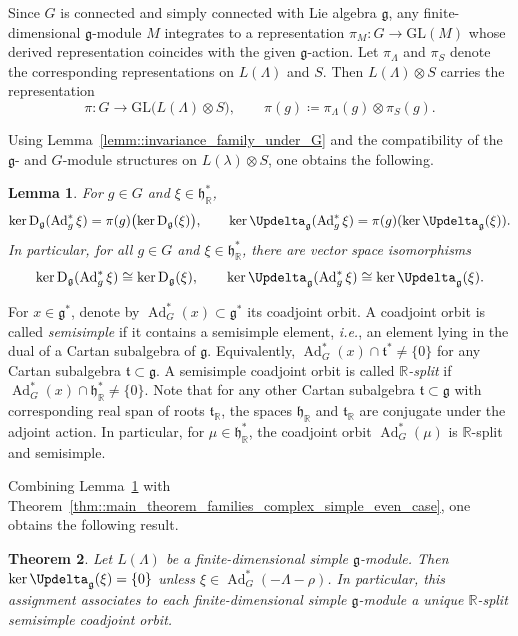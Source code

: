 \documentclass[11pt]{amsart}
\newcommand{\Dirac}{\operatorname{D}}
\def\Laplace{{\Updelta_{\gg}(\xi)}}
\def \Gl{{\mathrm{GL}}}
\def\RR{{\mathbb R}}
\def\hh{{\mathfrak h}}
\def\tt{{\mathfrak t}}
\def\gg{{\mathfrak{g}}}
\newcommand{\Ad}{\operatorname{Ad}}
\theoremstyle{plain}
\newtheorem{theorem}{Theorem}
\newtheorem{lemma}[theorem]{Lemma}
\theoremstyle{remark}
\theoremstyle{definition}
\numberwithin{equation}{section}
\theoremstyle{remark}
\begin{document}
Since $G$ is connected and simply connected with Lie algebra $\gg$, any finite-dimensional $\gg$-module $M$ integrates to a representation $\pi_{M}\colon G\to\Gl(M)$ whose derived representation coincides with the given $\gg$-action. Let $\pi_{\Lambda}$ and $\pi_{S}$ denote the corresponding representations on $L(\Lambda)$ and $S$. Then $L(\Lambda)\otimes S$ carries the representation
\begin{equation}
\pi\colon G\to\Gl\bigl(L(\Lambda)\otimes S\bigr),\qquad
\pi(g)\coloneqq \pi_{\Lambda}(g)\otimes\pi_{S}(g).
\end{equation}

Using Lemma~\ref{lemm::invariance_family_under_G} and the compatibility of the
$\gg$- and $G$-module structures on $L(\lambda)\otimes S$, one obtains the
following.

\begin{lemma} \label{lemm::invariance_kernel_under_G_action}
For $g\in G$ and $\xi\in\hh_{\RR}^{\ast}$,
\[
\ker\Dirac_{\gg}(\Ad_{g}^{\ast}\xi)=\pi(g)\bigl(\ker\Dirac_{\gg}(\xi)\bigr), \qquad \ker \Updelta_{\gg}(\Ad_{g}^{\ast}\xi)=\pi(g)(\ker \Updelta_{\gg}(\xi)).
\]
In particular, for all $g\in G$ and $\xi\in\hh_{\RR}^{\ast}$, there are vector space isomorphisms
\[
\ker \Dirac_{\gg}(\Ad_{g}^{\ast}\xi)\cong\ker \Dirac_{\gg}(\xi),
\qquad
\ker \Updelta_{\gg}(\Ad_{g}^{\ast}\xi)\cong \ker \Updelta_{\gg}(\xi).
\]
\end{lemma}

For $x\in\gg^{\ast}$, denote by $\Ad_{G}^{\ast}(x)\subset\gg^{\ast}$ its coadjoint orbit. A coadjoint orbit is called \emph{semisimple} if it contains a semisimple element, \emph{i.e.}, an element lying in the dual of a Cartan subalgebra of $\gg$. Equivalently, $\Ad_{G}^{\ast}(x)\cap\tt^{\ast}\neq\{0\}$ for any Cartan subalgebra $\tt\subset\gg$. A semisimple coadjoint orbit is called \emph{$\RR$-split} if $\Ad_{G}^{\ast}(x)\cap\hh_{\RR}^{\ast}\neq\{0\}$. Note that for any other Cartan subalgebra $\tt\subset\gg$ with corresponding real span of roots
$\tt_{\RR}$, the spaces $\hh_{\RR}$ and $\tt_{\RR}$ are conjugate under the adjoint
action. In particular, for $\mu\in\hh_{\RR}^{\ast}$, the coadjoint orbit
$\Ad_{G}^{\ast}(\mu)$ is $\RR$-split and semisimple.

Combining Lemma~\ref{lemm::invariance_kernel_under_G_action} with Theorem~\ref{thm::main_theorem_families_complex_simple_even_case}, one obtains the following result.

\begin{theorem} \label{thm::main_theorem_localization}
Let $L(\Lambda)$ be a finite-dimensional simple $\gg$-module. Then $\ker\Laplace=\{0\}$ unless $\xi\in \Ad_{G}^{\ast}(-\Lambda-\rho)$. In particular, this assignment associates to each finite-dimensional simple $\gg$-module a unique $\RR$-split semisimple coadjoint orbit.
\end{theorem}
\end{document}
